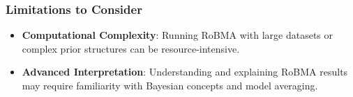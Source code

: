 \documentclass[
]{book}
\begin{document}
\subsubsection{Limitations to Consider}\label{limitations-to-consider}

\begin{itemize}
\item
  \textbf{Computational Complexity}: Running RoBMA with large datasets or complex prior structures can be resource-intensive.
\item
  \textbf{Advanced Interpretation}: Understanding and explaining RoBMA results may require familiarity with Bayesian concepts and model averaging.
\end{itemize}

  
\end{document}
